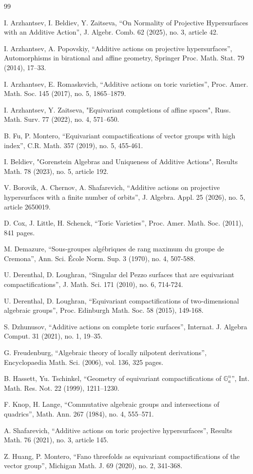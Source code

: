 \documentclass[a4paper,draft,reqno,12pt]{amsart}
\theoremstyle{definition}
\theoremstyle{definition}
\theoremstyle{remark}
\def\BG{{\mathbb G}}
\def\BG{{\mathbb G}}
\begin{document}
\begin{thebibliography}{99}

 I. Arzhantsev, I. Beldiev, Y. Zaitseva, “On Normality of Projective Hypersurfaces with an Additive Action”, J. Algebr. Comb. 62 (2025), no. 3, article 42.

 I. Arzhantsev, A. Popovskiy, “Additive actions on projective hypersurfaces”, Automorphisms in birational and affine geometry, Springer Proc. Math. Stat. 79 (2014), 17–33.

 I. Arzhantsev, E. Romaskevich, “Additive actions on toric varieties”, Proc. Amer. Math. Soc. 145 (2017), no. 5, 1865–1879.

 I. Arzhantsev, Y. Zaitseva, "Equivariant completions of affine spaces", Russ. Math. Surv. 77 (2022), no. 4, 571–650.

  B. Fu, P. Montero, “Equivariant compactifications of vector groups with high index”, C.R. Math. 357 (2019), no. 5, 455-461.

 I. Beldiev,  "Gorenstein Algebras and Uniqueness of Additive Actions", Results Math. 78 (2023), no. 5, article 192.

 V. Borovik, A. Chernov, A. Shafarevich, “Additive actions on projective hypersurfaces with a finite number of orbits”, J. Algebra. Appl. 25 (2026), no. 5, article 2650019.

 D. Cox, J. Little, H. Schenck, “Toric Varieties”, Proc. Amer. Math. Soc. (2011), 841 pages.

 M. Demazure, “Sous-groupes alg\'ebriques de rang maximum du groupe de {Cremona}”, Ann. Sci. \'Ecole Norm. Sup. 3 (1970), no. 4, 507-588.

 U. Derenthal, D. Loughran, “Singular del Pezzo surfaces that are equivariant compactifications”, J. Math. Sci. 171 (2010), no. 6, 714-724.

 U. Derenthal, D. Loughran, “Equivariant compactifications of two-dimensional algebraic groups”, Proc. Edinburgh Math. Soc. 58 (2015), 149-168.

 S. Dzhunusov, “Additive actions on complete toric surfaces”, Internat. J. Algebra Comput. 31 (2021), no. 1, 19–35.

 G. Freudenburg, “Algebraic theory of locally nilpotent derivations”,  Encyclopaedia Math. Sci. (2006), vol. 136, 325 pages.

 B. Hassett, Yu. Tschinkel, “Geometry of equivariant compactifications of $\BG_a^n$”, Int. Math. Res. Not. 22 (1999), 1211–1230.

 F. Knop, H. Lange, “Commutative algebraic groups and intersections of quadrics”, Math. Ann. 267 (1984), no. 4, 555–571.

 A. Shafarevich, “Additive actions on toric projective hypersurfaces”, Results Math. 76 (2021), no. 3, article 145.

 Z. Huang, P. Montero, “Fano threefolds as equivariant compactifications of the vector group”, Michigan Math. J. 69 (2020), no. 2, 341-368.


\end{thebibliography}
\end{document}

